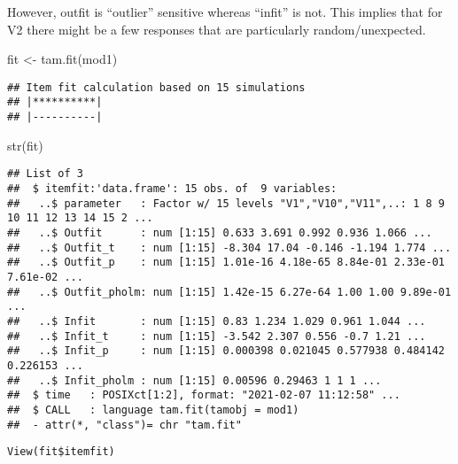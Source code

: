 \documentclass[
]{book}
\newenvironment{Shaded}{\begin{snugshade}}{\end{snugshade}}
\newcommand{\FunctionTok}[1]{\textcolor[rgb]{0.00,0.00,0.00}{#1}}
\newcommand{\NormalTok}[1]{#1}
\newcommand{\OtherTok}[1]{\textcolor[rgb]{0.56,0.35,0.01}{#1}}
\begin{document}
However, outfit is ``outlier'' sensitive whereas ``infit'' is not. This implies that for V2 there might be a few responses that are particularly random/unexpected.

\begin{Shaded}
\begin{Highlighting}[]
\NormalTok{fit }\OtherTok{\textless{}{-}} \FunctionTok{tam.fit}\NormalTok{(mod1)}
\end{Highlighting}
\end{Shaded}

\begin{verbatim}
## Item fit calculation based on 15 simulations
## |**********|
## |----------|
\end{verbatim}

\begin{Shaded}
\begin{Highlighting}[]
\FunctionTok{str}\NormalTok{(fit)}
\end{Highlighting}
\end{Shaded}

\begin{verbatim}
## List of 3
##  $ itemfit:'data.frame': 15 obs. of  9 variables:
##   ..$ parameter   : Factor w/ 15 levels "V1","V10","V11",..: 1 8 9 10 11 12 13 14 15 2 ...
##   ..$ Outfit      : num [1:15] 0.633 3.691 0.992 0.936 1.066 ...
##   ..$ Outfit_t    : num [1:15] -8.304 17.04 -0.146 -1.194 1.774 ...
##   ..$ Outfit_p    : num [1:15] 1.01e-16 4.18e-65 8.84e-01 2.33e-01 7.61e-02 ...
##   ..$ Outfit_pholm: num [1:15] 1.42e-15 6.27e-64 1.00 1.00 9.89e-01 ...
##   ..$ Infit       : num [1:15] 0.83 1.234 1.029 0.961 1.044 ...
##   ..$ Infit_t     : num [1:15] -3.542 2.307 0.556 -0.7 1.21 ...
##   ..$ Infit_p     : num [1:15] 0.000398 0.021045 0.577938 0.484142 0.226153 ...
##   ..$ Infit_pholm : num [1:15] 0.00596 0.29463 1 1 1 ...
##  $ time   : POSIXct[1:2], format: "2021-02-07 11:12:58" ...
##  $ CALL   : language tam.fit(tamobj = mod1)
##  - attr(*, "class")= chr "tam.fit"
\end{verbatim}

\begin{verbatim}
View(fit$itemfit)
\end{verbatim}
\end{document}
